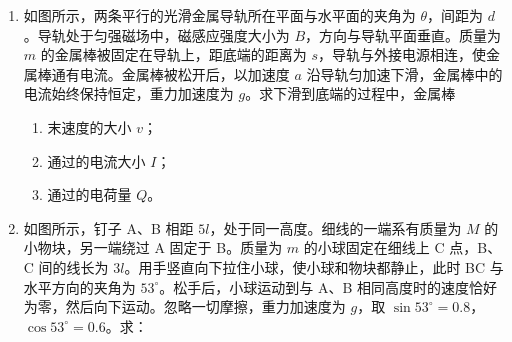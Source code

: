 \documentclass[\gkver]{gaokaozhenti}
\begin{document}
\begin{enumerate}
{\textbf{C．}（1）A 的半衰期为 $T$，经过 $2T$ 后剩余质量为原来的 $\frac{1}{4}$；B 的半衰期为 $2T$，经过 $2T$ 后剩余质量为原来的 $\frac{1}{2}$，故剩余质量之比为 $\frac{1}{4}:\frac{1}{2}=1:2$，故 B 正确。（2）根据光电效应方程 $E_{\text{k}}=h\nu-W_{0}$，又 $\nu=\frac{c}{\lambda}$，所以有 $0=\frac{hc}{\lambda_{0}}-W_{0}$，$E_{\text{k}}=\frac{2hc}{\lambda_{0}}-W_{0}$，解得 $E_{\text{k}}=\frac{hc}{\lambda_{0}}$；又光子动量 $p=\frac{h}{\lambda}$，所以 A、B 两种光子的动量之比为 $1:2$。（3）取向上为正方向，由动量定理得 $mv-(-mv)=I$，且 $I=(\overline{F}-mg)t$，解得 $I_{F}=\overline{F}t=2mv+mgt$。
}

\item
如图所示，两条平行的光滑金属导轨所在平面与水平面的夹角为 $\theta$，间距为 $d$。导轨处于匀强磁场中，磁感应强度大小为 $B$，方向与导轨平面垂直。质量为 $m$ 的金属棒被固定在导轨上，距底端的距离为 $s$，导轨与外接电源相连，使金属棒通有电流。金属棒被松开后，以加速度 $a$ 沿导轨匀加速下滑，金属棒中的电流始终保持恒定，重力加速度为 $g$。求下滑到底端的过程中，金属棒

\begin{enumerate}
	\item
	末速度的大小 $v$；
	\item
	通过的电流大小 $I$；
	\item
	通过的电荷量 $Q$。
\end{enumerate}



\item
如图所示，钉子 A、B 相距 $5l$，处于同一高度。细线的一端系有质量为 $M$ 的小物块，另一端绕过 A 固定于 B。质量为 $m$ 的小球固定在细线上 C 点，B、C 间的线长为 $3l$。用手竖直向下拉住小球，使小球和物块都静止，此时 BC 与水平方向的夹角为 $53^{\circ}$。松手后，小球运动到与 A、B 相同高度时的速度恰好为零，然后向下运动。忽略一切摩擦，重力加速度为 $g$，取 $\sin53^{\circ}=0.8$，$\cos53^{\circ}=0.6$。求：


\end{enumerate}
\end{document}
